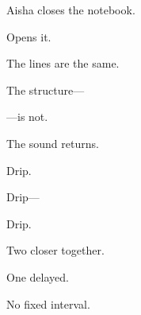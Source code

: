Aisha closes the notebook.

\medskip

Opens it.

\medskip

The lines are the same.

\medskip

The structure---

\medskip

---is not.

\medskip

The sound returns.

\medskip

Drip.

\medskip

Drip---

\medskip

Drip.

\medskip

Two closer together.

\medskip

One delayed.

\medskip

No fixed interval.
